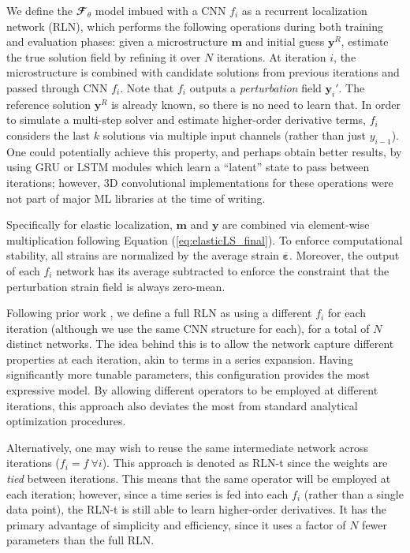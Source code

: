 \documentclass[3p, preprint]{elsarticle}
\newcommand{\bmeps}{\bm{\varepsilon}}
\newcommand{\epsavg}{\overline{\bmeps}}
\newcommand{\bmm}{\bm{m}}
\newcommand{\bmy}{\bm{y}}
\newcommand{\Ftheta}{\mathbfcal{F}_\theta}
\newenvironment{revision} {} {}
\begin{document}
We define the $\Ftheta$ model imbued with a CNN $f_i$ as a recurrent localization network (RLN), which performs the following operations during both training and evaluation phases: given a microstructure $\bmm$ and initial guess $\bmy^R$, estimate the true solution field by refining it over $N$ iterations. At iteration $i$, the microstructure is combined with candidate solutions from previous iterations and passed through CNN $f_i$. Note that $f_i$ outputs a \textit{perturbation} field $\bmy_i'$. The reference solution $\bmy^R$ is already known, so there is no need to learn that. In order to simulate a multi-step solver \cite{morton_mayers_2005, ullah_multistep} \begin{revision}
and estimate higher-order derivative terms\end{revision}, $f_i$ considers the last $k$ solutions via multiple input channels (rather than just $y_{i-1}$). \begin{revision}
One could potentially achieve this property, and perhaps obtain better results, by using GRU or LSTM modules \cite{putzky2017} which learn a ``latent'' state to pass between iterations; however, 3D convolutional implementations for these operations were not part of major ML libraries at the time of writing.
\end{revision}

Specifically for elastic localization, $\bmm$ and $\bmy$ are combined via element-wise multiplication following Equation (\ref{eq:elasticLS_final}). To enforce computational stability, all strains are normalized by the average strain $\epsavg$. Moreover, the output of each $f_i$ network has its average subtracted to enforce the constraint that the perturbation strain field is always zero-mean. 

Following prior work \cite{adler2018}, we define a full RLN as using a different $f_i$ for each iteration (although we use the same CNN structure for each), for a total of $N$ distinct networks. The idea behind this is to allow the network capture different properties at each iteration, akin to terms in a series expansion. Having significantly more tunable parameters, this configuration provides the most expressive model. By allowing different operators to be employed at different iterations, this approach also deviates the most from standard analytical optimization procedures. 

Alternatively, one may wish to reuse the same intermediate network across iterations ($f_{i} = f ~ \forall i$). This approach is denoted as RLN-t since the weights are \textit{tied} between iterations.  This means that the same operator will be employed at each iteration; however, since a time series is fed into each $f_i$ (rather than a single data point), the RLN-t is still able to learn higher-order derivatives. It has the primary advantage of simplicity and efficiency, since it uses a factor of $N$ fewer parameters than the full RLN. 
\end{document}
